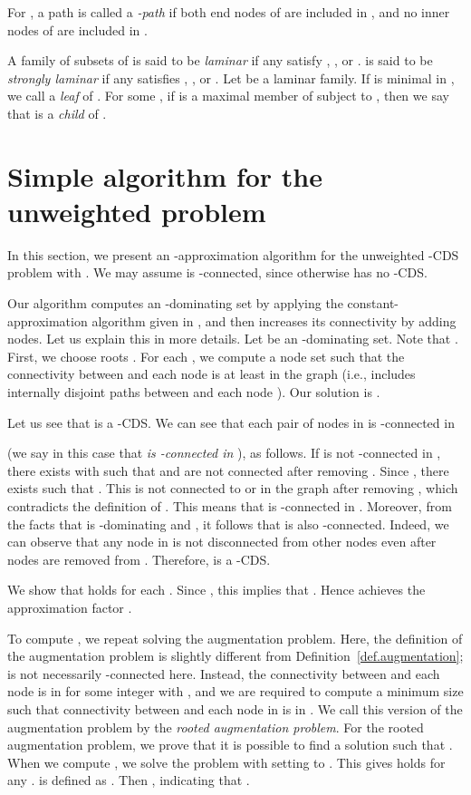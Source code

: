 \documentclass[11pt]{article}
\begin{document}
 For , a path  is called a \emph{-path}
 if both end nodes of  are included in , and no inner nodes of 
 are included in . 

A family  of subsets of  is said to be 
\emph{laminar}
if any  satisfy , ,
or .
 is said to be
\emph{strongly laminar}
if any  satisfies , ,
or .
Let  be a laminar family.
If  is minimal in ,
we call  a \emph{leaf} of .
For some ,
if  is a maximal member of  
subject to ,
then we say that  is a \emph{child} of .


\section{Simple algorithm for the unweighted problem}
\label{sec.simple}

In this section, we present an -approximation algorithm for the unweighted
-CDS problem
with .
We may assume  is -connected,
since otherwise  has no -CDS.

Our algorithm computes an -dominating set by 
applying the constant-approximation algorithm given in
\cite{Shang:2007jg},
and then increases its connectivity by adding nodes.
Let us explain this in more details.
Let  be an -dominating set.
Note that .
First,
we choose  roots .
For each ,
we compute a node set 
such that the connectivity between  and each node  is at least  in the graph 
(i.e.,  includes  internally disjoint paths between 
and each node ).
Our solution is .

Let us see that  is a -CDS.
We can see that each pair of nodes in  is -connected in

(we say in this case that \emph{ is -connected in }),
as follows.
If  is not -connected in ,
there exists 
with 
such that  and  are not connected after removing .
Since , there exists  such that .
This  is not connected to  or  in the graph after removing
, which contradicts the definition of .
This means that  is -connected in
.
Moreover, from the facts that  is -dominating and ,
it follows that  is also -connected.
Indeed, we can observe that any node in  is not disconnected from other
nodes even after  nodes are removed from .
Therefore,   is a -CDS.

We show that  holds for each .
Since ,
this implies that .
Hence   achieves the approximation factor .

To compute , we repeat solving the augmentation problem.
Here, the definition of the augmentation problem is slightly different
from Definition~\ref{def.augmentation};
 is not necessarily -connected here.
Instead, the connectivity between  and each node  is  in  for some integer 
with ,
and we are required to compute a minimum size 
such that
 connectivity between  and each node in  is  in .
We call this version of the augmentation problem by the \emph{rooted
augmentation problem}.
For the rooted augmentation problem,
 we prove that it is possible to find a solution 
 such that .
 When we compute , we solve the problem
 with setting  to .
 This gives 
 holds for any .
  is defined as .
 Then ,
 indicating that .
 
\end{document}
